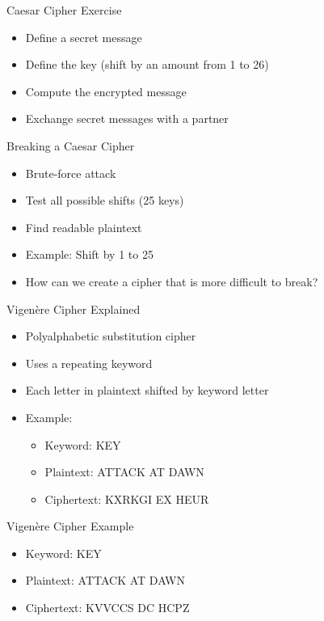 \begin{withoutheadline}
\begin{frame}{Caesar Cipher Exercise}
\begin{itemize}
    \item Define a secret message
    \item Define the key (shift by an amount from 1 to 26)
    \item Compute the encrypted message
    \item Exchange secret messages with a partner
\end{itemize}
\end{frame}

\begin{frame}{Breaking a Caesar Cipher}
\begin{itemize}
    \item Brute-force attack
    \item Test all possible shifts (25 keys)
    \item Find readable plaintext
    \item Example: Shift by 1 to 25
    \item How can we create a cipher that is more difficult to break?
\end{itemize}
\end{frame}

\begin{frame}{Vigenère Cipher Explained}
\begin{itemize}
    \item Polyalphabetic substitution cipher
    \item Uses a repeating keyword
    \item Each letter in plaintext shifted by keyword letter
    \item Example:
    \begin{itemize}
        \item Keyword: KEY
        \item Plaintext: ATTACK AT DAWN
        \item Ciphertext: KXRKGI EX HEUR
    \end{itemize}
\end{itemize}
\end{frame}

\begin{frame}{Vigenère Cipher Example}
\begin{itemize}
    \item Keyword: KEY
    \item Plaintext: ATTACK AT DAWN
    \item Ciphertext: KVVCCS DC HCPZ
\end{itemize}
\end{frame}


\end{withoutheadline}
